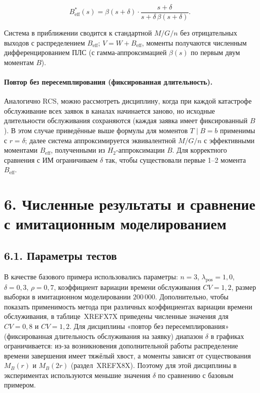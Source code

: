 \[B_{\mathrm{eff}}^{*}(s)=\beta(s+\delta)\cdot\frac{s+\delta}{s+\delta\,\beta(s+\delta)}.\]


Система в приближении сводится к стандартной \(M/G/n\) без отрицательных выходов с распределением \(B_{\mathrm{eff}}\); \(V=W+B_{\mathrm{eff}}\), моменты получаются численным дифференцированием ПЛС (с гамма-аппроксимацией \(\beta(s)\) по первым двум моментам \(B\)).

\paragraph{Повтор без пересемплирования (фиксированная длительность).}
Аналогично RCS, можно рассмотреть дисциплину, когда при каждой катастрофе обслуживание всех заявок в каналах начинается заново, но исходные длительности обслуживания сохраняются (каждая заявка имеет фиксированный \(B\)). В этом случае приведённые выше формулы для моментов \(T\mid B=b\) применимы с \(r=\delta\); далее система аппроксимируется эквивалентной \(M/G/n\) с эффективными моментами \(B_{\mathrm{eff}}\), полученными из \(H_2\)-аппроксимации \(B\). Для корректного сравнения с ИМ ограничиваем \(\delta\) так, чтобы существовали первые 1--2 момента \(B_{\mathrm{eff}}\).




\section*{6. Численные результаты и сравнение с имитационным моделированием}
\subsection*{6.1. Параметры тестов}
В качестве базового примера использовались параметры: \(n=3\), \(\lambda_{\text{pos}}=1{,}0\), \(\delta=0{,}3\), \(\rho=0{,}7\), коэффициент вариации времени обслуживания \(CV=1{,}2\), размер выборки в имитационном моделировании \(200\,000\).
Дополнительно, чтобы показать применимость метода при различных коэффициентах вариации времени обслуживания, в таблице~XREFX7X приведены численные значения для \(CV=0{,}8\) и \(CV=1{,}2\).
Для дисциплины «повтор без пересемплирования» (фиксированная длительность обслуживания на заявку) диапазон \(\delta\) в графиках ограничивается: из-за возникновения дополнительной работы распределение времени завершения имеет тяжёлый хвост, а моменты зависят от существования \(M_B(r)\) и \(M_B(2r)\) (раздел~XREFX8X). Поэтому для этой дисциплины в экспериментах используются меньшие значения \(\delta\) по сравнению с базовым примером.

